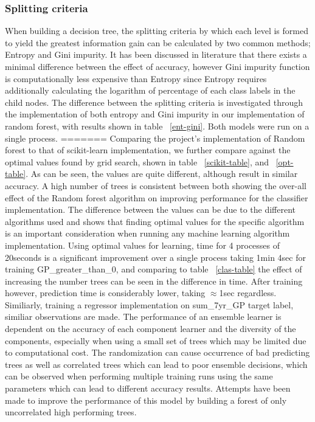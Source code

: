 \documentclass{article} %
\begin{document}
\subsubsection{Splitting criteria}

When building a decision tree, the splitting criteria by which each level is formed to yield the greatest information gain can be calculated by two common methods; Entropy and Gini impurity. It has been discussed in literature that there exists a minimal difference between the effect of accuracy, however Gini
impurity function is computationally less expensive than Entropy since Entropy requires additionally calculating the logarithm of percentage of each class labels in the child nodes. The difference between the splitting criteria is investigated through the implementation of both entropy and Gini impurity in our implementation of random forest, with results shown in table ~\ref{ent-gini}. Both models were run on a single process.
=======
Comparing the project's implementation of Random forest to that of scikit-learn implementation, we further compare against the optimal values found by grid search, shown in table ~\ref{scikit-table}, and ~\ref{opt-table}. As can be seen, the values are quite different, although result in similar accuracy. A high number of trees is consistent between both showing the over-all effect of the Random forest algorithm on improving performance for the classifier implementation. The difference between the values can be due to the different algorithms used and shows that finding optimal values for the specific algorithm is an important consideration when running any machine learning algorithm implementation. Using optimal values for learning, time for 4 processes of 20seconds is a significant improvement over a single process taking 1min 4sec for training GP\_greater\_than\_0, and comparing to table ~\ref{clas-table} the effect of increasing the number trees can be seen in the difference in time. After training however, prediction time is considerably lower, taking $\approx$1sec regardless. Similiarly, training a regressor implementation on sum\_7yr\_GP target label, similiar observations are made. The performance of an ensemble learner is dependent on the accuracy of each component learner and the diversity of the components, especially when using a small set of trees which may be limited due to computational cost. The randomization can cause occurrence of bad predicting trees as well as correlated trees which can lead to poor ensemble decisions, which can be observed when performing multiple training runs using the same parameters which can lead to different accuracy results. Attempts have been made to improve the performance of this model by building a forest of only uncorrelated high performing trees. \cite{Bharathidason2014}
\end{document}
